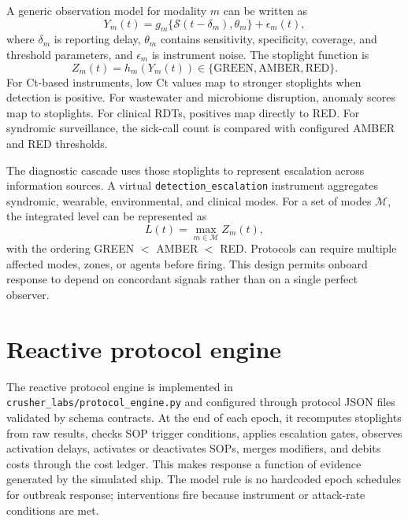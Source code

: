 A generic observation model for modality $m$ can be written as
\begin{equation}
Y_m(t)=g_m\{\mathcal{S}(t-\delta_m),\theta_m\}+\epsilon_m(t),
\end{equation}
where $\delta_m$ is reporting delay, $\theta_m$ contains sensitivity, specificity, coverage, and threshold parameters, and $\epsilon_m$ is instrument noise. The stoplight function is
\begin{equation}
Z_m(t)=h_m(Y_m(t))\in\{\mathrm{GREEN},\mathrm{AMBER},\mathrm{RED}\}.
\end{equation}
For Ct-based instruments, low Ct values map to stronger stoplights when detection is positive. For wastewater and microbiome disruption, anomaly scores map to stoplights. For clinical RDTs,
positives map directly to RED. For syndromic surveillance, the sick-call count is compared with configured AMBER and RED thresholds.

The diagnostic cascade uses those stoplights to represent escalation across information sources. A virtual \texttt{detection\_escalation} instrument aggregates syndromic, wearable,
environmental, and clinical modes. For a set of modes $\mathcal{M}$, the integrated level can be represented as
\begin{equation}
L(t)=\max_{m\in\mathcal{M}} Z_m(t),
\end{equation}
with the ordering GREEN $<$ AMBER $<$ RED. Protocols can require multiple affected modes, zones, or agents before firing. This design permits onboard response to depend on concordant signals
rather than on a single perfect observer.

\section{Reactive protocol engine}
The reactive protocol engine is implemented in \texttt{crusher\_labs/protocol\_engine.py} and configured through protocol JSON files validated by schema contracts. At the end of each epoch,
it recomputes stoplights from raw results, checks SOP trigger conditions, applies escalation gates, observes activation delays, activates or deactivates SOPs, merges modifiers, and debits
costs through the cost ledger. This makes response a function of evidence generated by the simulated ship. The model rule is no hardcoded epoch schedules for outbreak response; interventions
fire because instrument or attack-rate conditions are met.

